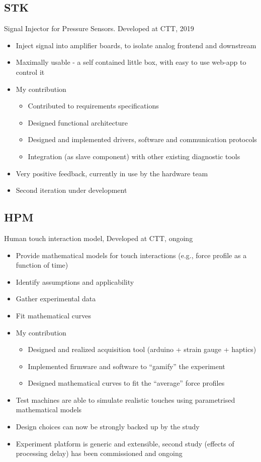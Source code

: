 \documentclass{if-beamer}
\begin{document}
\subsection{STK}
\begin{frame}
Signal Injector for Pressure Sensors. Developed at CTT, 2019

\begin{itemize}
\item Inject signal into amplifier boards, to isolate analog frontend and downstream
\item Maximally usable - a self contained little box, with easy to use web-app to control it
\item My contribution
\begin{itemize}
\item Contributed to requirements specifications
\item Designed functional architecture
\item Designed and implemented drivers, software and communication protocols
\item Integration (as slave component) with other existing diagnostic tools
\end{itemize}
\item Very positive feedback, currently in use by the hardware team
\item Second iteration under development
\end{itemize}
\end{frame}


\subsection{HPM}
\begin{frame}

Human touch interaction model, Developed at CTT, ongoing

\begin{itemize}
\item Provide mathematical models for touch interactions (e.g., force profile as a function of time)
\item Identify assumptions and applicability
\item Gather experimental data
\item Fit mathematical curves
\item My contribution
\begin{itemize}
\item Designed and realized acquisition tool (arduino + strain gauge + haptics)
\item Implemented firmware and software to ``gamify'' the experiment
\item Designed mathematical curves to fit the ``average'' force profiles
\end{itemize}
\item Test machines are able to simulate realistic touches using parametrised mathematical models
\item Design choices can now be strongly backed up by the study
\item Experiment platform is generic and extensible, second study (effects of processing delay) has been commissioned and ongoing
\end{itemize}
\end{frame}
\end{document}
